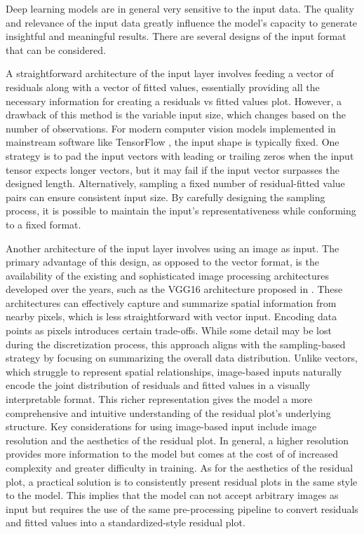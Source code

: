 \documentclass[]{interact}
\theoremstyle{plain}%
\theoremstyle{definition}
\theoremstyle{remark}
\begin{document}
Deep learning models are in general very sensitive to the input data.
The quality and relevance of the input data greatly influence the
model's capacity to generate insightful and meaningful results. There
are several designs of the input format that can be considered.

A straightforward architecture of the input layer involves feeding a
vector of residuals along with a vector of fitted values, essentially
providing all the necessary information for creating a residuals vs
fitted values plot. However, a drawback of this method is the variable
input size, which changes based on the number of observations. For
modern computer vision models implemented in mainstream software like
TensorFlow \citep{abadi2016tensorflow}, the input shape is typically
fixed. One strategy is to pad the input vectors with leading or trailing
zeros when the input tensor expects longer vectors, but it may fail if
the input vector surpasses the designed length. Alternatively, sampling
a fixed number of residual-fitted value pairs can ensure consistent
input size. By carefully designing the sampling process, it is possible
to maintain the input's representativeness while conforming to a fixed
format.

Another architecture of the input layer involves using an image as
input. The primary advantage of this design, as opposed to the vector
format, is the availability of the existing and sophisticated image
processing architectures developed over the years, such as the VGG16
architecture proposed in \citet{simonyan2014very}. These architectures
can effectively capture and summarize spatial information from nearby
pixels, which is less straightforward with vector input. Encoding data
points as pixels introduces certain trade-offs. While some detail may be
lost during the discretization process, this approach aligns with the
sampling-based strategy by focusing on summarizing the overall data
distribution. Unlike vectors, which struggle to represent spatial
relationships, image-based inputs naturally encode the joint
distribution of residuals and fitted values in a visually interpretable
format. This richer representation gives the model a more comprehensive
and intuitive understanding of the residual plot's underlying structure.
Key considerations for using image-based input include image resolution
and the aesthetics of the residual plot. In general, a higher resolution
provides more information to the model but comes at the cost of of
increased complexity and greater difficulty in training. As for the
aesthetics of the residual plot, a practical solution is to consistently
present residual plots in the same style to the model. This implies that
the model can not accept arbitrary images as input but requires the use
of the same pre-processing pipeline to convert residuals and fitted
values into a standardized-style residual plot.
\end{document}
